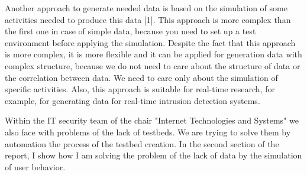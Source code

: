 
Another approach to generate needed data is based on the simulation of some activities needed to produce this data [1]. This approach is more complex than the first one in case of simple data, because you need to set up a test environment before applying the simulation. Despite the fact that this approach is more complex, it is more flexible and it can be applied for generation data with complex structure, because we do not need to care about the structure of data or the correlation between data. We need to care only about the simulation of specific activities. Also, this approach is suitable for real-time research, for example, for generating data for real-time intrusion detection systems. 

 

Within the IT security team of the chair "Internet Technologies and Systems" we also face with problems of the lack of testbeds. We are trying to solve them by automation the process of the testbed creation. In the second section of the report, I show how I am solving the problem of the lack of data by the simulation of user behavior.



